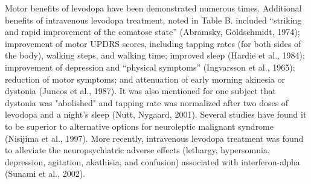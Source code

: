 Motor benefits of levodopa have been demonstrated numerous times. Additional benefits of intravenous levodopa treatment, noted in Table B. included “striking and rapid improvement of the comatose state” (Abramsky, Goldschmidt, 1974); improvement of motor UPDRS scores, including tapping rates (for both sides of the body), walking steps, and walking time; improved sleep (Hardie et al., 1984); improvement of depression and “physical symptoms” (Ingvarsson et al., 1965); reduction of motor symptoms; and attenuation of early morning akinesia or dystonia (Juncos et al., 1987).  It was also mentioned for one subject that dystonia was "abolished" and tapping rate was normalized after two doses of levodopa and a night's sleep (Nutt, Nygaard, 2001).  Several studies have found it to be superior to alternative options for neuroleptic malignant syndrome (Nisijima et al., 1997).  More recently, intravenous levodopa treatment was found to alleviate the neuropsychiatric adverse effects (lethargy, hypersomnia, depression, agitation, akathisia, and confusion) associated with interferon-alpha (Sunami et al., 2002).